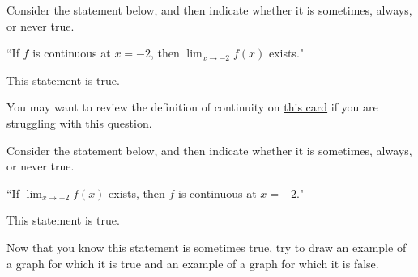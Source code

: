 \documentclass[handout]{ximera}
\begin{document}
\begin{exercise}

Consider the statement below, and then indicate whether it is sometimes, always, or never true.

\begin{center} ``If $f$ is continuous at $x=-2$, then $\displaystyle\lim_{x\to -2} f(x)$ exists." \end{center}

This statement is  true.

\begin{hint}

You may want to review the definition of continuity on \href{https://ximera.osu.edu/math160fa17/m160exam1content/limitLaws/digInContinuity}{this card} if you are struggling with this question. 

\end{hint}

\end{exercise}

\begin{exercise}

Consider the statement below, and then indicate whether it is sometimes, always, or never true.

\begin{center} ``If $\displaystyle\lim_{x\to -2} f(x)$ exists, then $f$ is continuous at $x=-2$." \end{center}

This statement is  true.

\begin{feedback}[correct]

Now that you know this statement is sometimes true, try to draw an example of a graph for which it is true and an example of a graph for which it is false.  

\end{feedback}

\end{exercise}
\end{document}

